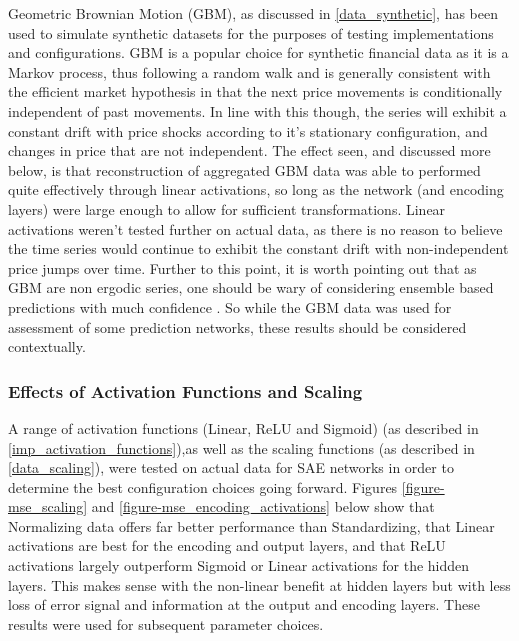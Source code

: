 \documentclass[a4paper,11pt,oneside]{article}
\theoremstyle{plain}
\theoremstyle{definition}
\begin{document}
Geometric Brownian Motion (GBM), as discussed in \ref{data_synthetic}, has been used to simulate synthetic datasets for the purposes of testing implementations and configurations. GBM is a popular choice for synthetic financial data as it is a Markov process, thus following a random walk and is generally consistent with the efficient market hypothesis in that the next price movements is conditionally independent of past movements. In line with this though, the series will exhibit a constant drift with price shocks according to it's stationary configuration, and changes in price that are not independent. The effect seen, and discussed more below, is that reconstruction of aggregated GBM data was able to performed quite effectively through linear activations, so long as the network (and encoding layers) were large enough to allow for sufficient transformations. Linear activations weren't tested further on actual data, as there is no reason to believe the time series would continue to exhibit the constant drift with non-independent price jumps over time. Further to this point, it is worth pointing out that as GBM are non ergodic series, one should be wary of considering ensemble based predictions with much confidence \cite{Peters}. So while the GBM data was used for assessment of some prediction networks, these results should be considered contextually.

\subsubsection{Effects of Activation Functions and Scaling}\label{results_activations_scaling}

A range of activation functions (Linear, ReLU and Sigmoid) (as described in \ref{imp_activation_functions}),as well as the scaling functions (as described in \ref{data_scaling}), were tested on actual data for SAE networks in order to determine the best configuration choices going forward. Figures \ref{figure-mse_scaling} and \ref{figure-mse_encoding_activations} below show that Normalizing data offers far better performance than Standardizing, that Linear activations are best for the encoding and output layers, and that ReLU activations largely outperform Sigmoid or Linear activations for the hidden layers. This makes sense with the non-linear benefit at hidden layers but with less loss of error signal and information at the output and encoding layers. These results were used for subsequent parameter choices.
\end{document}
